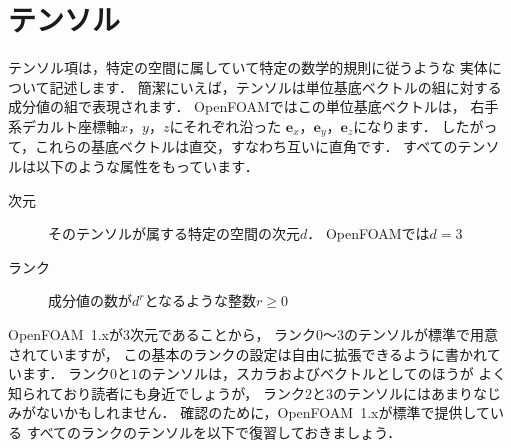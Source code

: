 \section{テンソル}
\label{sec:1.2}
テンソル項は，特定の空間に属していて特定の数学的規則に従うような
実体について記述します．
簡潔にいえば，テンソルは単位基底ベクトルの組に対する
成分値の組で表現されます．
OpenFOAMではこの単位基底ベクトルは，
右手系デカルト座標軸$x$，$y$，$z$にそれぞれ沿った
$\mathbf{e}_{x}$，$\mathbf{e}_{y}$，$\mathbf{e}_{z}$になります．
したがって，これらの基底ベクトルは直交，すなわち互いに直角です．
すべてのテンソルは以下のような属性をもっています．
\begin{description}
 \item[次元] そのテンソルが属する特定の空間の次元$d$．
            OpenFOAMでは$d = 3$
 \item[ランク] 成分値の数が$d^{r}$となるような整数$r \ge 0$
\end{description}
OpenFOAM~1.xが3次元であることから，
ランク$0$〜$3$のテンソルが標準で用意されていますが，
この基本のランクの設定は自由に拡張できるように書かれています．
ランク$0$と$1$のテンソルは，スカラおよびベクトルとしてのほうが
よく知られており読者にも身近でしょうが，
ランク$2$と$3$のテンソルにはあまりなじみがないかもしれません．
確認のために，OpenFOAM~1.xが標準で提供している
すべてのランクのテンソルを以下で復習しておきましょう．
